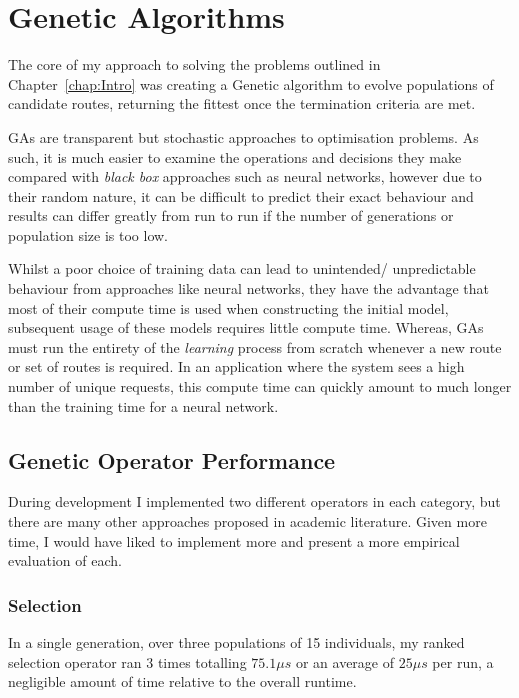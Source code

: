\section{Genetic Algorithms}
\label{sec:eval:GAs}

The core of my approach to solving the problems outlined in Chapter~\ref{chap:Intro} was creating a Genetic algorithm to evolve populations of candidate routes, returning the fittest once the termination criteria are met.

GAs are transparent but stochastic approaches to optimisation problems. As such, it is much easier to examine the operations and decisions they make compared with \textit{black box} approaches such as neural networks, however due to their random nature, it can be difficult to predict their exact behaviour and results can differ greatly from run to run if the number of generations or population size is too low.

Whilst a poor choice of training data can lead to unintended/ unpredictable behaviour from approaches like neural networks, they have the advantage that most of their compute time is used when constructing the initial model, subsequent usage of these models requires little compute time. Whereas, GAs must run the entirety of the \textit{learning} process from scratch whenever a new route or set of routes is required. In an application where the system sees a high number of unique requests, this compute time can quickly amount to much longer than the training time for a neural network.

\subsection{Genetic Operator Performance}

During development I implemented two different operators in each category, but there are many other approaches proposed in academic literature. Given more time, I would have liked to implement more and present a more empirical evaluation of each.

\subsubsection{Selection}

In a single generation, over three populations of 15 individuals, my ranked selection operator ran 3 times totalling $75.1\mu s$ or an average of $25 \mu s$ per run, a negligible amount of time relative to the overall runtime.

